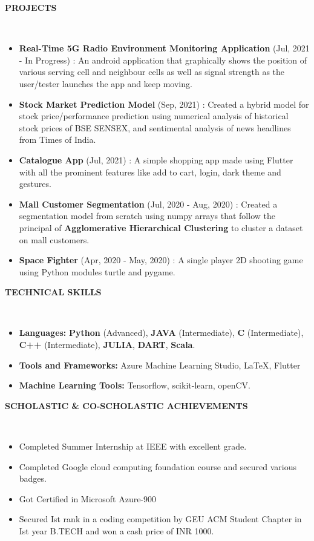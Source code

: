 \documentclass[a4paper,10pt]{article}
\newcommand{\lsep}{-0.5cm}
\newcommand{\resheading}[1]{{\small \colorbox{mygrey}{\begin{minipage}{0.975\textwidth}{\textbf{#1 \vphantom{p\^{E}}}}\end{minipage}}}}
\begin{document}
\resheading{\textbf{PROJECTS} }\\[\lsep]
\begin{itemize}
\setlength\itemsep{0.5em}
\item \textbf{Real-Time 5G Radio Environment Monitoring Application} (Jul, 2021 - In Progress) : An android application that graphically shows the position of various serving cell and neighbour cells as well as signal strength as the user/tester launches the app and keep moving.
\item \textbf{Stock Market Prediction Model} (Sep, 2021) : Created a hybrid model for stock price/performance prediction using numerical analysis of historical stock prices of BSE SENSEX, and sentimental analysis of news headlines from Times of India.
\item \textbf{Catalogue App} (Jul, 2021) : A simple shopping app made using Flutter with all the prominent features like add to cart, login, dark theme and gestures.
\item \textbf{Mall Customer Segmentation} (Jul, 2020 - Aug, 2020) : Created a segmentation model from scratch using numpy arrays that follow the principal of \textbf{Agglomerative Hierarchical Clustering} to cluster a dataset on mall customers.
\item \textbf{Space Fighter} (Apr, 2020 - May, 2020) : A single player 2D shooting game using Python modules turtle and pygame.
\end{itemize}

\resheading{\textbf{TECHNICAL SKILLS} }\\[\lsep]
\begin{itemize}
\setlength\itemsep{0em}
\item \noindent \textbf{Languages:} \textbf{Python} (Advanced), \textbf{JAVA} (Intermediate), \textbf{C} (Intermediate), \textbf{C++} (Intermediate), \textbf{JULIA}, \textbf{DART}, \textbf{Scala}.\\
\item \noindent\textbf{Tools and Frameworks:} Azure Machine Learning Studio, \LaTeX, Flutter\\
\item \noindent \textbf{Machine Learning Tools:} Tensorflow, scikit-learn, openCV.
\end{itemize}

\resheading{\textbf{SCHOLASTIC \& CO-SCHOLASTIC ACHIEVEMENTS} }\\[\lsep]
\begin{itemize}
\setlength\itemsep{0em}
\item \noindent Completed Summer Internship at IEEE with excellent grade.
\item \noindent Completed Google cloud computing foundation course and secured various badges.
\item \noindent Got Certified in Microsoft Azure-900
\item \noindent Secured Ist rank in a coding competition by GEU ACM Student Chapter in Ist year B.TECH and won a cash price of INR 1000.
\end{itemize}
\end{document}

